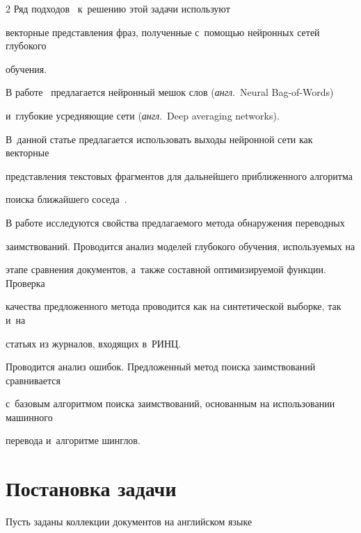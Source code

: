 \begin{multicols}{2}
Ряд подходов~\cite{Socher1,wieting,Iyyer,vbta} к~решению этой задачи используют 


векторные пред\-став\-ле\-ния фраз, полученные с~по\-мощью нейронных сетей глубокого 


обуче\-ния.


В работе~\cite{Iyyer} предлагается  нейронный мешок слов (\textit{англ}.\ Neural Bag-of-Words) 


и~глубокие усред\-ня\-ющие сети (\textit{англ}.\ Deep averaging networks).


В~данной \mbox{статье} предлагается использовать выходы нейронной сети как векторные 


пред\-став\-ле\-ния текс\-то\-вых фрагментов для дальнейшего при\-бли\-жен\-но\-го алгоритма 


поиска бли\-жай\-ше\-го соседа~\cite{ann}.





В работе исследуются свойства предлагаемого метода обнаружения переводных 


заимствований. Проводится анализ моделей глубокого обучения, используемых на 


этапе сравнения документов, а~также составной оптимизируемой функции. Проверка 


качества предложенного метода проводится как на синтетической выборке, так и~на 


статьях из журналов, входящих в~РИНЦ. 


Проводится анализ ошибок. Предложенный метод поиска заимствований сравнивается 


с~базовым алгоритмом поиска заимствований, основанным на использовании машинного 


перевода и~алгоритме шинглов.





\vspace*{-6pt}





\section{Постановка задачи}





Пусть заданы коллекции документов на английском языке 






\end{multicols}
